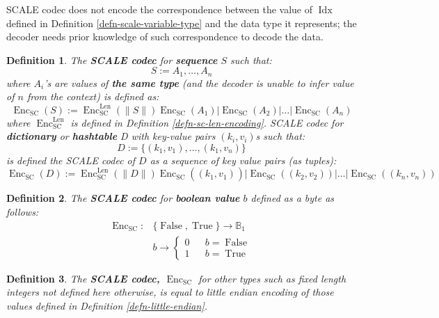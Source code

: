 \documentclass{book}
\newcommand{\assign}{:=}
\newcommand{\tmop}[1]{\ensuremath{\operatorname{#1}}}
\newcommand{\tmstrong}[1]{\textbf{#1}}
\newcommand{\tmtextbf}[1]{{\bfseries{#1}}}
\newtheorem{definition}{Definition}
\providecommand{\tmop}[1]{\ensuremath{\mathrm{#1}}}
\providecommand{\tmstrong}[1]{\tmtextbf{#1}}
\providecommand{\tmtextbf}[1]{\tmtextbf{#1}}
\newtheorem{definition}{Definition}
\begin{document}
SCALE codec does not encode the correspondence between the value of
$\tmop{Idx}$ defined in Definition \ref{defn-scale-variable-type} and the data
type it represents; the decoder needs prior knowledge of such correspondence
to decode the data.

\begin{definition}
  \label{defn-scale-list}The {\tmstrong{SCALE codec}} for
  {\tmstrong{sequence}} $S$ such that:
  \[ S \assign A_1, \ldots, A_n \]
  where $A_i$'s are values of {\tmstrong{the same type}} (and the decoder is
  unable to infer value of $n$ from the context) is defined as:
  \[ \tmop{Enc}_{\tmop{SC}} (S) \assign \tmop{Enc}^{\tmop{Len}}_{\tmop{SC}}
     (\| S \|) \tmop{Enc}_{\tmop{SC}} (A_1) | \tmop{Enc}_{\tmop{SC}} (A_2) |
     \ldots | \tmop{Enc}_{\tmop{SC}} (A_n) \]
  where $\tmop{Enc}_{\tmop{SC}}^{\tmop{Len}}$ is defined in Definition
  \ref{defn-sc-len-encoding}. SCALE codec for {\tmstrong{dictionary}} or
  {\tmstrong{hashtable}} D with key-value pairs $(k_i, v_i)$s such that:
  \[ D \assign \{ (k_1, v_1), \ldots, (k_1, v_n) \} \]
  is defined the SCALE codec of $D$ as a sequence of key value pairs (as
  tuples):
  \[ \tmop{Enc}_{\tmop{SC}} (D) \assign \tmop{Enc}^{\tmop{Len}}_{\tmop{SC}}
     (\| D \|) \tmop{Enc}_{\tmop{SC}} ((k_1, v_1)_{}) | \tmop{Enc}_{\tmop{SC}}
     ((k_2, v_2)) | \ldots | \tmop{Enc}_{\tmop{SC}} ((k_n, v_n)) \]
  \[ \  \]
\end{definition}

\begin{definition}
  The {\tmstrong{SCALE codec}} for {\tmstrong{boolean value}} $b$ defined as a
  byte as follows:
  \[ \begin{array}{ll}
       \tmop{Enc}_{\tmop{SC}} : & \{ \tmop{False}, \tmop{True} \} \rightarrow
       \mathbb{B}_1\\
       & b \rightarrow \left\{ \begin{array}{lcl}
         0 &  & b = \tmop{False}\\
         1 &  & b = \tmop{True}
       \end{array} \right.
     \end{array} \]
\end{definition}

\begin{definition}
  \label{defn-scale-fixed-length}The {\tmstrong{SCALE codec,
  $\tmop{Enc}_{\tmop{SC}}$}} for other types such as fixed length integers not
  defined here otherwise, is equal to little endian encoding of those values
  defined in Definition \ref{defn-little-endian}. 
\end{definition}
\end{document}
